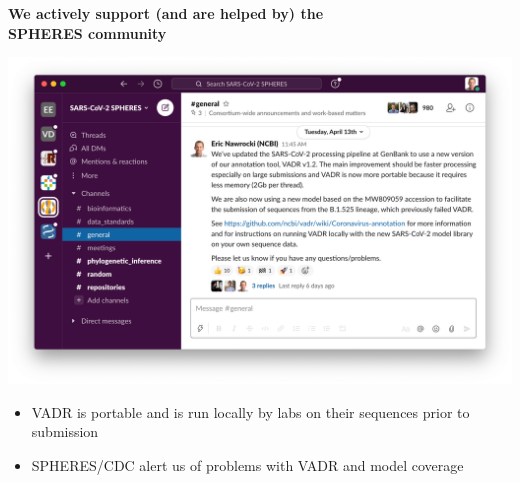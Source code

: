 \documentclass[landscape]{slides}
\begin{document}
%
%
\begin{slide}
\begin{center}
\large{\textbf{We actively support (and are helped by) the \\ SPHERES community}}

\includegraphics[width=8.5in]{figs/spheres-slack-apr132021}

\small
\begin{itemize}
\item VADR is portable and is run locally by labs on their sequences prior to submission
\item SPHERES/CDC alert us of problems with VADR and model coverage
\end{itemize}

\end{center}

\vfill
\end{slide}
\end{document}
